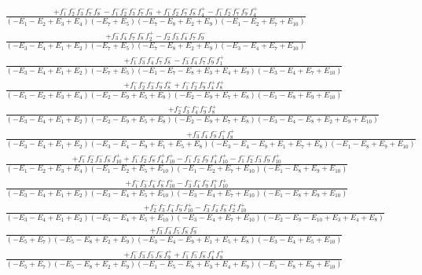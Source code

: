 \documentclass{article}
\begin{document}
\[\begin{array}{rcl}
\frac{+f_{1}^{-}f_{2}^{-}f_{3}^{-}f_{7}^{-}f_{8}^{-}-f_{1}^{-}f_{2}^{-}f_{3}^{-}f_{7}^{-}f_{9}^{-}+f_{1}^{-}f_{2}^{-}f_{7}^{-}f_{8}^{-}f_{4}^{+}-f_{1}^{-}f_{2}^{-}f_{7}^{-}f_{9}^{-}f_{4}^{+}}{(-E_{1}-E_{2}+E_{3}+E_{4})(-E_{7}+E_{5})(-E_{7}-E_{8}+E_{2}+E_{9})(-E_{1}-E_{2}+E_{7}+E_{10})}\\
\frac{+f_{3}^{-}f_{4}^{-}f_{7}^{-}f_{8}^{-}f_{2}^{+}-f_{2}^{-}f_{3}^{-}f_{4}^{-}f_{7}^{-}f_{9}^{-}}{(-E_{3}-E_{4}+E_{1}+E_{2})(-E_{7}+E_{5})(-E_{7}-E_{8}+E_{2}+E_{9})(-E_{3}-E_{4}+E_{7}+E_{10})}\\
\frac{+f_{1}^{-}f_{3}^{-}f_{4}^{-}f_{7}^{-}f_{8}^{-}-f_{3}^{-}f_{4}^{-}f_{7}^{-}f_{9}^{-}f_{1}^{+}}{(-E_{3}-E_{4}+E_{1}+E_{2})(-E_{7}+E_{5})(-E_{1}-E_{7}-E_{8}+E_{3}+E_{4}+E_{9})(-E_{3}-E_{4}+E_{7}+E_{10})}\\
\frac{+f_{1}^{-}f_{2}^{-}f_{3}^{-}f_{9}^{-}f_{8}^{+}+f_{1}^{-}f_{2}^{-}f_{9}^{-}f_{4}^{+}f_{8}^{+}}{(-E_{1}-E_{2}+E_{3}+E_{4})(-E_{2}-E_{9}+E_{5}+E_{8})(-E_{2}-E_{9}+E_{7}+E_{8})(-E_{1}-E_{8}+E_{9}+E_{10})}\\
\frac{+f_{2}^{-}f_{3}^{-}f_{4}^{-}f_{9}^{-}f_{8}^{+}}{(-E_{3}-E_{4}+E_{1}+E_{2})(-E_{2}-E_{9}+E_{5}+E_{8})(-E_{2}-E_{9}+E_{7}+E_{8})(-E_{3}-E_{4}-E_{8}+E_{2}+E_{9}+E_{10})}\\
\frac{+f_{3}^{-}f_{4}^{-}f_{9}^{-}f_{1}^{+}f_{8}^{+}}{(-E_{3}-E_{4}+E_{1}+E_{2})(-E_{3}-E_{4}-E_{9}+E_{1}+E_{5}+E_{8})(-E_{3}-E_{4}-E_{9}+E_{1}+E_{7}+E_{8})(-E_{1}-E_{8}+E_{9}+E_{10})}\\
\frac{+f_{1}^{-}f_{2}^{-}f_{3}^{-}f_{8}^{-}f_{10}^{+}+f_{1}^{-}f_{2}^{-}f_{8}^{-}f_{4}^{+}f_{10}^{+}-f_{1}^{-}f_{2}^{-}f_{9}^{-}f_{4}^{+}f_{10}^{+}-f_{1}^{-}f_{2}^{-}f_{3}^{-}f_{9}^{-}f_{10}^{+}}{(-E_{1}-E_{2}+E_{3}+E_{4})(-E_{1}-E_{2}+E_{5}+E_{10})(-E_{1}-E_{2}+E_{7}+E_{10})(-E_{1}-E_{8}+E_{9}+E_{10})}\\
\frac{+f_{1}^{-}f_{3}^{-}f_{4}^{-}f_{8}^{-}f_{10}^{+}-f_{3}^{-}f_{4}^{-}f_{9}^{-}f_{1}^{+}f_{10}^{+}}{(-E_{3}-E_{4}+E_{1}+E_{2})(-E_{3}-E_{4}+E_{5}+E_{10})(-E_{3}-E_{4}+E_{7}+E_{10})(-E_{1}-E_{8}+E_{9}+E_{10})}\\
\frac{+f_{2}^{-}f_{3}^{-}f_{4}^{-}f_{9}^{-}f_{10}^{+}-f_{3}^{-}f_{4}^{-}f_{8}^{-}f_{2}^{+}f_{10}^{+}}{(-E_{3}-E_{4}+E_{1}+E_{2})(-E_{3}-E_{4}+E_{5}+E_{10})(-E_{3}-E_{4}+E_{7}+E_{10})(-E_{2}-E_{9}-E_{10}+E_{3}+E_{4}+E_{8})}\\
\frac{+f_{3}^{-}f_{4}^{-}f_{5}^{-}f_{8}^{-}f_{9}^{-}}{(-E_{5}+E_{7})(-E_{5}-E_{8}+E_{2}+E_{9})(-E_{3}-E_{4}-E_{9}+E_{1}+E_{5}+E_{8})(-E_{3}-E_{4}+E_{5}+E_{10})}\\
\frac{+f_{1}^{-}f_{3}^{-}f_{5}^{-}f_{8}^{-}f_{9}^{+}+f_{1}^{-}f_{5}^{-}f_{8}^{-}f_{4}^{+}f_{9}^{+}}{(-E_{5}+E_{7})(-E_{5}-E_{8}+E_{2}+E_{9})(-E_{1}-E_{5}-E_{8}+E_{3}+E_{4}+E_{9})(-E_{1}-E_{8}+E_{9}+E_{10})}\\

\end{array}\]
\end{document}
